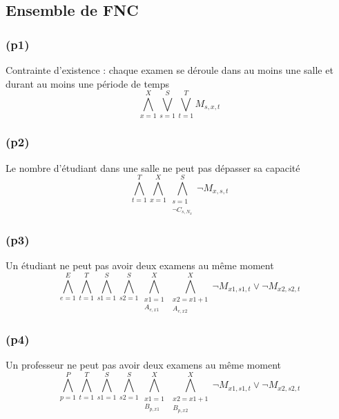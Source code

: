 \documentclass[a4paper,11pt]{article}
\begin{document}
\subsection{Ensemble de FNC}
\subsubsection{(p1)}
Contrainte d'existence : chaque examen se déroule dans au moins une salle et durant au moins une période de temps
\begin{displaymath}
	\bigwedge\limits_{x=1}^{X}\bigvee\limits_{s=1}^{S}\bigvee\limits_{t=1}^{T} M_{s,x,t}
\end{displaymath}


\subsubsection{(p2)}
Le nombre d'étudiant dans une salle ne peut pas dépasser sa capacité
\begin{displaymath}
	\bigwedge\limits_{t=1}^{T}\bigwedge\limits_{x=1}^{X}\bigwedge\limits_{\substack{s=1 \\ \neg C_{s,N_{x}}}}^{S}  \neg M_{x,s,t}
\end{displaymath}

\subsubsection{(p3)}
Un étudiant ne peut pas avoir deux examens au même moment
\begin{displaymath}
\bigwedge\limits_{e=1}^{E}\bigwedge\limits_{t=1}^{T}\bigwedge\limits_{s1=1}^{S}\bigwedge\limits_{s2=1}^{S}\bigwedge\limits_{\substack{x1=1 \\ A_{e,x1}}}^{X}\bigwedge\limits_{\substack{x2=x1+1 \\ A_{e,x2}}}^{X} \neg M_{x1, s1, t} \vee \neg M_{x2, s2, t}
\end{displaymath}

\subsubsection{(p4)}
Un professeur ne peut pas avoir deux examens au même moment
\begin{displaymath}
\bigwedge\limits_{p=1}^{P}\bigwedge\limits_{t=1}^{T}\bigwedge\limits_{s1=1}^{S}\bigwedge\limits_{s2=1}^{S}\bigwedge\limits_{\substack{x1=1 \\ B_{p,x1}}}^{X}\bigwedge\limits_{\substack{x2=x1+1 \\ B_{p,x2}}}^{X} \neg M_{x1, s1, t} \vee \neg M_{x2, s2, t}
\end{displaymath}
\end{document}
